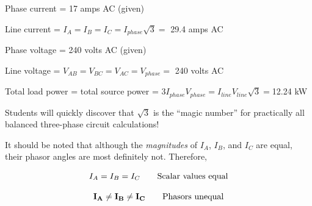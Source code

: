 
Phase current = 17 amps AC (given)

Line current = $I_A = I_B = I_C = I_{phase} \sqrt{3} = $ 29.4 amps AC

\vskip 10pt

Phase voltage = 240 volts AC (given)

Line voltage = $V_{AB} = V_{BC} = V_{AC} = V_{phase} = $ 240 volts AC

\vskip 10pt

Total load power = total source power = $3 I_{phase} V_{phase} = I_{line} V_{line} \sqrt{3} = $12.24 kW







Students will quickly discover that $\sqrt{3}$ is the ``magic number'' for practically all balanced three-phase circuit calculations!

It should be noted that although the {\it magnitudes} of $I_A$, $I_B$, and $I_C$ are equal, their phasor angles are most definitely not.  Therefore,

$$I_A = I_B = I_C \hbox{\hskip 20pt Scalar values equal}$$

$${\bf I_A} \neq {\bf I_B} \neq {\bf I_C} \hbox{\hskip 20pt Phasors unequal}$$




